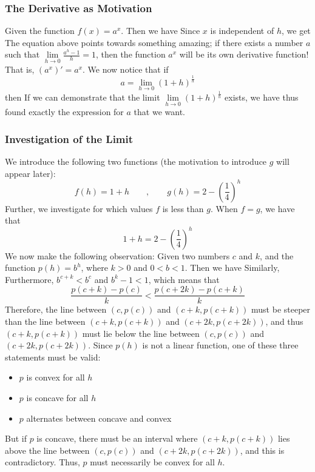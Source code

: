 



	
 \label{eulerstallfork}
\subsubsection{The Derivative as Motivation}
Given the function $ f(x)=a^x $. Then we have
Since $ x $ is independent of $ h $, we get
The equation above points towards something amazing; if there exists a number $ a $ such that $ {\lim\limits_{h\to 0}\frac{a^h-1}{h}=1} $, then the function $ a^x $ will be its own derivative function! That is, $ \left(a^x\right)'=a^x $. We now notice that if
\[ a=\lim\limits_{h\to 0}\left(1+h\right)^\frac{1}{h} \]
then
If we can demonstrate that the limit $ \lim\limits_{h\to 0}\left(1+h\right)^\frac{1}{h} $ exists, we have thus found exactly the expression for $ a $ that we want.

\subsubsection{Investigation of the Limit}
We introduce the following two functions (the motivation to introduce $ g $ will appear later):
\[ f(h)=1+h \qquad,\qquad g(h)=2-\left(\frac{1}{4}\right)^{h}\]
Further, we investigate for which values $ f $ is less than $ g $. When $ f=g $, we have that
\begin{equation}\label{eforkleqh}
	1+h=2-\left(\frac{1}{4}\right)^h 
\end{equation}
We now make the following observation: Given two numbers $ c $ and $ k $, and the function $ p(h)=b^h $, where $ k>0 $ and $ 0<b<1 $. Then we have
Similarly,
Furthermore, $ b^{c+k}<b^c $ and $ b^k-1<1 $, which means that
\[ \frac{p(c+k)-p(c)}{k}<\frac{p(c+2k)-p(c+k)}{k} \]
Therefore, the line between $ (c, p(c)) $ and $ (c+k, p(c+k)) $ must be steeper than the line between $ (c+k, p(c+k)) $ and $ (c+2k, p(c+2k)) $, and thus $ (c+k, p(c+k)) $ must lie below the line between $ (c, p(c)) $ and $ (c+2k, p(c+2k)) $.
Since $ p(h) $ is not a linear function, one of these three statements must be valid:
\begin{itemize}
	\item $ p $ is convex for all $ h$
	\item $ p $ is concave for all $ h $
	\item $ p $ alternates between concave and convex
\end{itemize}
But if $ p $ is concave, there must be an interval where $ (c+k, p(c+k)) $ lies above the line between $ (c, p(c)) $ and $ (c+2k, p(c+2k)) $, and this is contradictory. Thus, $ p $ must necessarily be convex for all $ h $.\vsk

